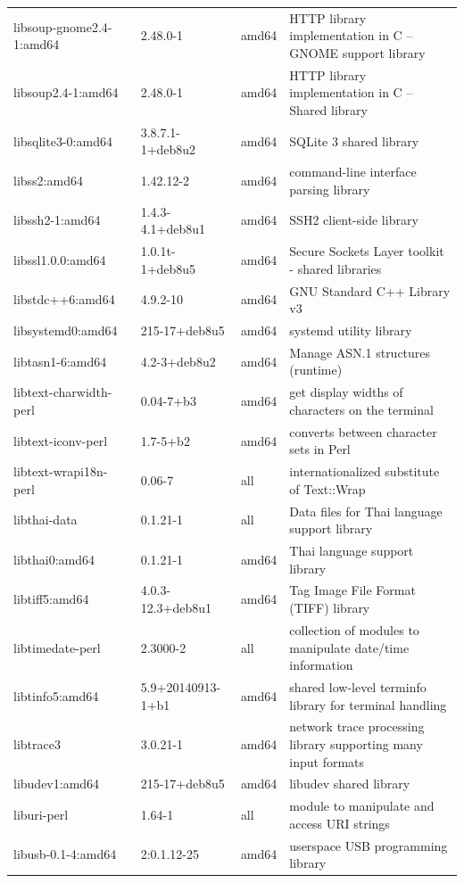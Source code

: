\documentclass[a4paper,10pt]{article}
\begin{document}
\begin{appendices}
{\begin{longtable}{p{3.25cm}@{\hspace{0.25cm}}p{4cm}@{\hspace{0.25cm}}l@{\hspace{0.25cm}}p{7cm}}
libsoup-gnome2.4-1:amd64	&	2.48.0-1	&	amd64	&	HTTP library implementation in C -- GNOME support library	\\
libsoup2.4-1:amd64	&	2.48.0-1	&	amd64	&	HTTP library implementation in C -- Shared library	\\
libsqlite3-0:amd64	&	3.8.7.1-1+deb8u2	&	amd64	&	SQLite 3 shared library	\\
libss2:amd64	&	1.42.12-2	&	amd64	&	command-line interface parsing library	\\
libssh2-1:amd64	&	1.4.3-4.1+deb8u1	&	amd64	&	SSH2 client-side library	\\
libssl1.0.0:amd64	&	1.0.1t-1+deb8u5	&	amd64	&	Secure Sockets Layer toolkit - shared libraries	\\
libstdc++6:amd64	&	4.9.2-10	&	amd64	&	GNU Standard C++ Library v3	\\
libsystemd0:amd64	&	215-17+deb8u5	&	amd64	&	systemd utility library	\\
libtasn1-6:amd64	&	4.2-3+deb8u2	&	amd64	&	Manage ASN.1 structures (runtime)	\\
libtext-charwidth-perl	&	0.04-7+b3	&	amd64	&	get display widths of characters on the terminal	\\
libtext-iconv-perl	&	1.7-5+b2	&	amd64	&	converts between character sets in Perl	\\
libtext-wrapi18n-perl	&	0.06-7	&	all	&	internationalized substitute of Text::Wrap	\\
libthai-data	&	0.1.21-1	&	all	&	Data files for Thai language support library	\\
libthai0:amd64	&	0.1.21-1	&	amd64	&	Thai language support library	\\
libtiff5:amd64	&	4.0.3-12.3+deb8u1	&	amd64	&	Tag Image File Format (TIFF) library	\\
libtimedate-perl	&	2.3000-2	&	all	&	collection of modules to manipulate date/time information	\\
libtinfo5:amd64	&	5.9+20140913-1+b1	&	amd64	&	shared low-level terminfo library for terminal handling	\\
libtrace3	&	3.0.21-1	&	amd64	&	network trace processing library supporting many input formats	\\
libudev1:amd64	&	215-17+deb8u5	&	amd64	&	libudev shared library	\\
liburi-perl	&	1.64-1	&	all	&	module to manipulate and access URI strings	\\
libusb-0.1-4:amd64	&	2:0.1.12-25	&	amd64	&	userspace USB programming library	\\

\end{longtable}}
\end{appendices}
\end{document}
